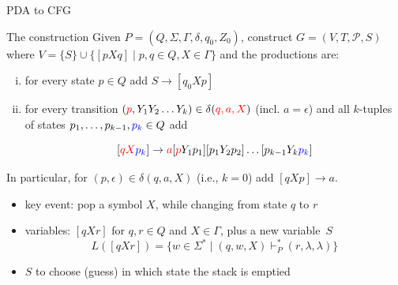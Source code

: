 \documentclass[handout]{beamer}
\begin{document}
\begin{frame}{PDA to CFG}

    \begin{block}{The construction}
        Given $P=(Q,\Sigma,\Gamma,\delta,q_0,Z_0)$, construct $G=(V,T,\mathcal P,S)$ where $V=\{S\}\cup\{[pXq]\mid p,q\in Q,X\in\Gamma\}$ and the productions are:   
        \begin{enumerate}[(i)]
            \item for every state $p\in Q$ add $S\to [q_0Xp]$ 
            \item for every transition $({\color{red}p},Y_1Y_2\ldots Y_k)\in\delta({\color{red}q,a,X})$ (incl. $a=\epsilon$) and \alert{all $k$-tuples of states} $p_1,\dots,p_{k-1},{\color{blue}p_k}\in Q$ add
            
            \vspace{-6pt}
            $$
            [{\color{red}qX}{\color{blue}p_k}]\rightarrow {\color{red}a}[{\color{red}p}Y_1p_1][p_1Y_2p_2]\ldots [p_{k-1}Y_k{\color{blue}p_k}]
            $$                  
        \end{enumerate}        
        In particular, for $(p,\epsilon)\in\delta(q,a,X)$ (i.e., $k=0$) add $[qXp]\rightarrow a$.
    \end{block}

    \vspace{-6pt}
    \begin{itemize}
        \item key event: pop a symbol $X$, while changing from state $q$ to $r$
        \item variables: $[qXr]$ for $q,r\in Q$ and $X\in \Gamma$, plus a new variable~$S$
        $$
        L([qXr])=\{w\in\Sigma^*\mid (q,w,X)\vdash_P^*(r,\lambda,\lambda)\}
        $$
        \item $S$ to choose (guess) in which state the stack is emptied
    \end{itemize}

\end{frame}
\end{document}
